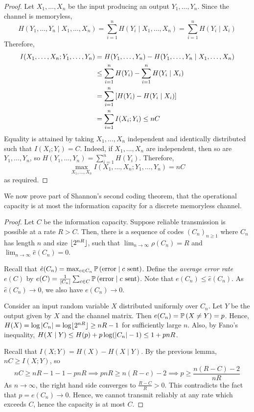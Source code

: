 \begin{proof}
    Let \( X_1, \dots, X_n \) be the input producing an output \( Y_1, \dots, Y_n \).
    Since the channel is memoryless,
    \[ H(Y_1, \dots, Y_n \mid X_1, \dots, X_n) = \sum_{i=1}^n H(Y_i \mid X_1, \dots, X_n) = \sum_{i=1}^n H(Y_i \mid X_i) \]
    Therefore,
    \begin{align*}
        I(X_1, \dots, X_n; Y_1, \dots, Y_n) &= H(Y_1, \dots, Y_n) - H(Y_1, \dots, Y_n \mid X_1, \dots, X_n) \\
        &\leq \sum_{i=1}^n H(Y_i) - \sum_{i=1}^n H(Y_i \mid X_i) \\
        &= \sum_{i=1}^n \qty[H(Y_i) - H(Y_i \mid X_i)] \\
        &= \sum_{i=1}^n I(X_i;Y_i) \leq nC
    \end{align*}
    Equality is attained by taking \( X_1, \dots, X_n \) independent and identically distributed such that \( I(X_i;Y_i) = C \).
    Indeed, if \( X_1, \dots, X_n \) are independent, then so are \( Y_1, \dots, Y_n \), so \( H(Y_1, \dots, Y_n) = \sum_{i=1}^n H(Y_i) \).
    Therefore,
    \[ \max_{X_1, \dots, X_n} I(X_1, \dots, X_n; Y_1, \dots, Y_n) = nC \]
    as required.
\end{proof}
We now prove part of Shannon's second coding theorem, that the operational capacity is at most the information capacity for a discrete memoryless channel.
\begin{proof}
    Let \( C \) be the information capacity.
    Suppose reliable transmission is possible at a rate \( R > C \).
    Then, there is a sequence of codes \( (C_n)_{n \geq 1} \) where \( C_n \) has length \( n \) and size \( \lfloor2^{nR}\rfloor \), such that \( \lim_{n \to \infty} \rho(C_n) = R \) and \( \lim_{n \to \infty} \hat e(C_n) = 0 \).

    Recall that \( \hat e(C_n) = \max_{c \in C_n} \mathbb{P}\left({\text{error} \mid c \text{ sent}}\right) \).
    Define the \emph{average error rate} \( e(C) \) by \( e(C) = \frac{1}{\abs{C_n}} \sum_{c \in C} \mathbb{P}\left({\text{error} \mid c \text{ sent}}\right) \).
    Note that \( e(C_n) \leq \hat e(C_n) \).
    As \( \hat e(C_n) \to 0 \), we also have \( e(C_n) \to 0 \).

    Consider an input random variable \( X \) distributed uniformly over \( C_n \).
    Let \( Y \) be the output given by \( X \) and the channel matrix.
    Then \( e(C_n) = \mathbb{P}\left({X \neq Y}\right) = p \).
    Hence, \( H(X) = \log \abs{C_n} = \log \lfloor2^{nR}\rfloor \geq nR - 1 \) for sufficiently large \( n \).
    Also, by Fano's inequality, \( H(X \mid Y) \leq H(p) + p \log(\abs{C_n} - 1) \leq 1 + pnR \).

    Recall that \( I(X;Y) = H(X) - H(X \mid Y) \).
    By the previous lemma, \( nC \geq I(X;Y) \), so
    \[ nC \geq nR - 1 - 1 - pnR \implies pnR \geq n(R - c) - 2 \implies p \geq \frac{n(R - C) - 2}{nR} \]
    As \( n \to \infty \), the right hand side converges to \( \frac{R - C}{R} > 0 \).
    This contradicts the fact that \( p = e(C_n) \to 0 \).
    Hence, we cannot transmit reliably at any rate which exceeds \( C \), hence the capacity is at most \( C \).
\end{proof}
